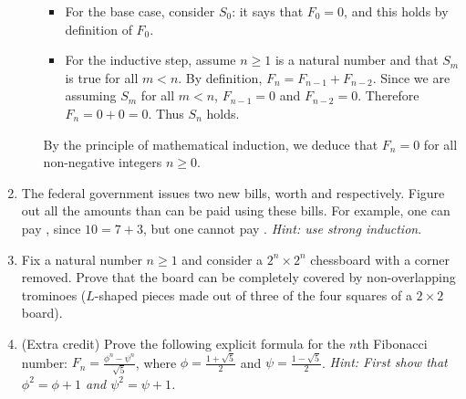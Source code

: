 \documentclass{amsart}
\theoremstyle{definition}
\begin{document}
\begin{enumerate}
\begin{enumerate}
    \begin{itemize}
    \item For the base case, consider $S_0$: it says that $F_0 = 0$, and this holds by definition of $F_0$.
    \item For the inductive step, assume $n \ge 1$ is a natural number and that $S_m$ is true for all $m < n$. By definition, $F_n = F_{n - 1} + F_{n - 2}$. Since we are assuming $S_m$ for all $m < n$, $F_{n - 1} = 0$ and $F_{n - 2} = 0$. Therefore $F_n = 0 + 0 = 0$. Thus $S_n$ holds.
    \end{itemize}

    By the principle of mathematical induction, we deduce that $F_n = 0$ for all non-negative integers $n \ge 0$.
  \end{enumerate}

\item The federal government issues two new bills, worth  and  respectively. Figure out all the amounts than can be paid using these bills. For example, one can pay , since $10 = 7 + 3$, but one cannot pay . \emph{Hint: use strong induction}.
\item Fix a natural number $n \ge 1$ and consider a $2^n \times 2^n$ chessboard with a corner removed. Prove that the board can be completely covered by non-overlapping trominoes ($L$-shaped pieces made out of three of the four squares of a $2 \times 2$ board).
\item (Extra credit) Prove the following explicit formula for the $n$th Fibonacci number: $F_n = \frac{\phi^n - \psi^n}{\sqrt{5}}$, where $\phi = \frac{1 + \sqrt{5}}{2}$ and $\psi = \frac{1 - \sqrt{5}}{2}$. \emph{Hint: First show that $\phi^2 = \phi + 1$ and $\psi^2 = \psi + 1$.}

\end{enumerate}


\end{document}
